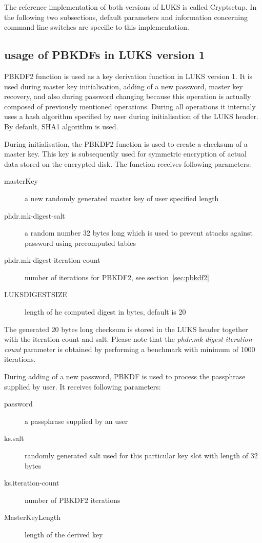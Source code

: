 \documentclass[nolof]{fithesis3}
\begin{document}
The reference implementation of both versions of LUKS is called Cryptsetup. In the following two subsections, default parameters and information concerning command line switches are specific to this implementation.

\subsection{usage of PBKDFs in LUKS version 1}
PBKDF2 function is used as a key derivation function in LUKS version 1. It is used during master key initialisation, adding of a new password, master key recovery, and also during password changing because this operation is actually composed of previously mentioned operations. During all operations it internaly uses a hash algorithm specified by user during initialisation of the LUKS header. By default, SHA1 algorithm is used.

During initialisation, the PBKDF2 function is used to create a checksum of a master key. This key is subsequently used for symmetric encryption of actual data stored on the encrypted disk. The function receives following parameters:

\begin{description}
\item[masterKey] a new randomly generated master key of user specified length

\item[phdr.mk-digest-salt] a random number 32 bytes long which is used to prevent attacks against password using precomputed tables \parencite[see][section 5.6.3]{itmc14}

\item[phdr.mk-digest-iteration-count] number of iterations for PBKDF2, see section~\ref{sec:pbkdf2}

\item[LUKS\-DIGEST\-SIZE] length of he computed digest in bytes, default is 20

\end{description}

The generated 20 bytes long checksum is stored in the LUKS header together with the iteration count and salt. Please note that the \emph{phdr.mk-digest-iteration-count} parameter is obtained by performing a benchmark with minimum of 1000 iterations.

During adding of a new password, PBKDF is used to process the passphrase supplied by user. It receives following parameters:

\begin{description}
\item[password] a passphrase supplied by an user

\item[ks.salt] randomly generated salt used for this particular key slot with length of 32 bytes

\item[ks.iteration-count] number of PBKDF2 iterations

\item[MasterKeyLength] length of the derived key

\end{description}
\end{document}
